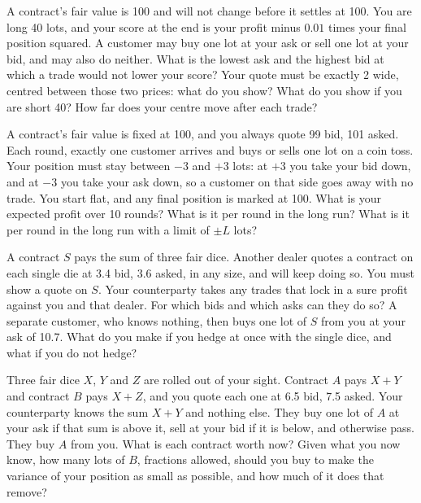 \begin{question}\label{iq:iv2:making-a-market:16}
A contract's fair value is 100 and will not change before it settles at 100. You are long 40 lots, and your score at the end is your profit minus $0.01$ times your final position squared. A customer may buy one lot at your ask or sell one lot at your bid, and may also do neither. What is the lowest ask and the highest bid at which a trade would not lower your score? Your quote must be exactly 2 wide, centred between those two prices: what do you show? What do you show if you are short 40? How far does your centre move after each trade?
\end{question}

\begin{question}\label{iq:iv2:making-a-market:17}
A contract's fair value is fixed at 100, and you always quote 99 bid, 101 asked. Each round, exactly one customer arrives and buys or sells one lot on a coin toss. Your position must stay between $-3$ and $+3$ lots: at $+3$ you take your bid down, and at $-3$ you take your ask down, so a customer on that side goes away with no trade. You start flat, and any final position is marked at 100. What is your expected profit over 10 rounds? What is it per round in the long run? What is it per round in the long run with a limit of $\pm L$ lots?
\end{question}

\begin{question}\label{iq:iv2:making-a-market:18}
A contract $S$ pays the sum of three fair dice. Another dealer quotes a contract on each single die at 3.4 bid, 3.6 asked, in any size, and will keep doing so. You must show a quote on $S$. Your counterparty takes any trades that lock in a sure profit against you and that dealer. For which bids and which asks can they do so? A separate customer, who knows nothing, then buys one lot of $S$ from you at your ask of 10.7. What do you make if you hedge at once with the single dice, and what if you do not hedge?
\end{question}

\begin{question}\label{iq:iv2:making-a-market:19}
Three fair dice $X$, $Y$ and $Z$ are rolled out of your sight. Contract $A$ pays $X + Y$ and contract $B$ pays $X + Z$, and you quote each one at 6.5 bid, 7.5 asked. Your counterparty knows the sum $X + Y$ and nothing else. They buy one lot of $A$ at your ask if that sum is above it, sell at your bid if it is below, and otherwise pass. They buy $A$ from you. What is each contract worth now? Given what you now know, how many lots of $B$, fractions allowed, should you buy to make the variance of your position as small as possible, and how much of it does that remove?
\end{question}

